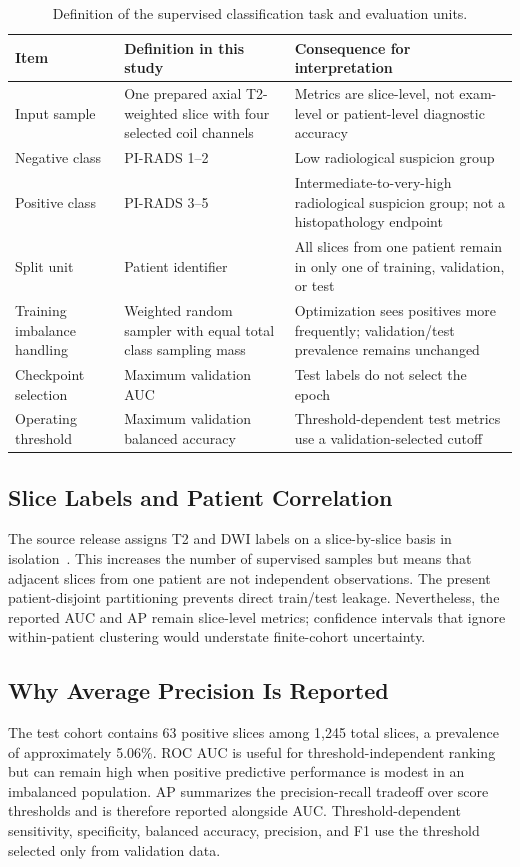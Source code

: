 \begin{table}[t]
\centering
\caption{Definition of the supervised classification task and evaluation units.}
\label{tab:task-definition}
\scriptsize
\begin{tabularx}{\textwidth}{L{3.1cm}L{4.3cm}X}
\toprule
Item & Definition in this study & Consequence for interpretation \\
\midrule
Input sample & One prepared axial T2-weighted slice with four selected coil channels & Metrics are slice-level, not exam-level or patient-level diagnostic accuracy \\
Negative class & PI-RADS 1--2 & Low radiological suspicion group \\
Positive class & PI-RADS 3--5 & Intermediate-to-very-high radiological suspicion group; not a histopathology endpoint \\
Split unit & Patient identifier & All slices from one patient remain in only one of training, validation, or test \\
Training imbalance handling & Weighted random sampler with equal total class sampling mass & Optimization sees positives more frequently; validation/test prevalence remains unchanged \\
Checkpoint selection & Maximum validation AUC & Test labels do not select the epoch \\
Operating threshold & Maximum validation balanced accuracy & Threshold-dependent test metrics use a validation-selected cutoff \\
\bottomrule
\end{tabularx}
\end{table}

\subsection{Slice Labels and Patient Correlation}
The source release assigns T2 and DWI labels on a slice-by-slice basis in isolation~\cite{Tibrewala2024FastMRIProstate}. This increases the number of supervised samples but means that adjacent slices from one patient are not independent observations. The present patient-disjoint partitioning prevents direct train/test leakage. Nevertheless, the reported AUC and AP remain slice-level metrics; confidence intervals that ignore within-patient clustering would understate finite-cohort uncertainty.

\subsection{Why Average Precision Is Reported}
The test cohort contains 63 positive slices among 1,245 total slices, a prevalence of approximately 5.06\%. ROC AUC is useful for threshold-independent ranking but can remain high when positive predictive performance is modest in an imbalanced population. AP summarizes the precision-recall tradeoff over score thresholds and is therefore reported alongside AUC. Threshold-dependent sensitivity, specificity, balanced accuracy, precision, and F1 use the threshold selected only from validation data.

